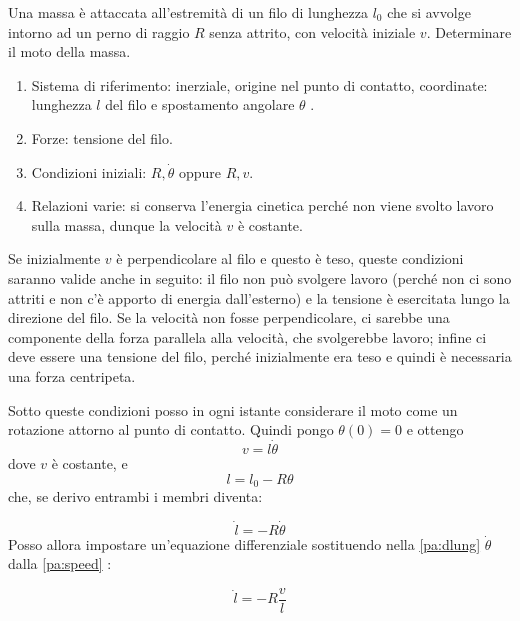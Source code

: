 \documentclass[../main.tex]{subfiles}
\begin{document}

\textex
Una massa \`e attaccata all'estremit\`a di un filo di lunghezza $l_0$ che si avvolge intorno ad un perno di raggio $R$ senza attrito, con velocit\`a iniziale $v$. Determinare il moto della massa.

\solution
\begin{enumerate}
\item Sistema di riferimento: inerziale, origine nel punto di contatto, coordinate: lunghezza $l$ del filo e spostamento angolare $\theta $ .
\item Forze: tensione del filo.
\item Condizioni iniziali: $R,\dot \theta$ oppure $R,v$.
\item Relazioni varie: si conserva l'energia cinetica perch\'e non viene svolto lavoro sulla massa, dunque la velocit\`a $v$ \`e costante.
\end{enumerate}

Se inizialmente $v$ \`e perpendicolare al filo e questo \`e teso, queste condizioni saranno valide anche in seguito: il filo non pu\`o svolgere lavoro (perch\'e non ci sono attriti e non c'\`e apporto di energia dall'esterno) e la tensione \`e esercitata lungo la direzione del filo. Se la velocit\`a non fosse perpendicolare, ci sarebbe una componente della forza parallela alla velocit\`a, che svolgerebbe lavoro; infine ci deve essere una tensione del filo, perch\'e inizialmente era teso e quindi \`e necessaria una forza centripeta.

Sotto queste condizioni posso in ogni istante considerare il moto come un rotazione attorno al punto di contatto. Quindi pongo $\theta(0)=0$ e ottengo
\begin{equation}
\label{pa:speed}
v=l \dot \theta
\end{equation}
dove $v$ \`e costante, e
\begin{equation}
\label{pa:lung}
l=l_0 - R \theta
\end{equation}
che, se derivo entrambi i membri diventa:

\begin{equation}
\label{pa:dlung}
\dot l= -R \dot \theta
\end{equation}
Posso allora impostare un'equazione differenziale sostituendo nella \cref{pa:dlung} $\dot \theta$ dalla \cref{pa:speed} :

\begin{equation}
\label{pa:diff}
\dot l = -R \frac{v}{l}
\end{equation}
\end{document}
